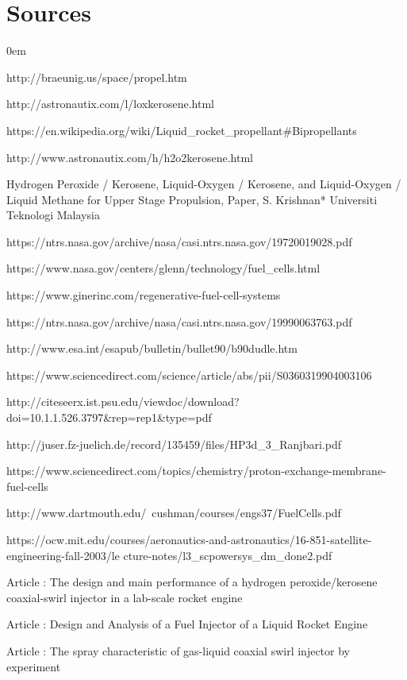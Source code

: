 \documentclass[a4paper,12pt,calibri,oneside,openany]{book}
\theoremstyle{break}
\begin{document}
\chapter*{Sources}
\pagestyle{empty}
\begin{enumerate}
	\itemsep0em 
	\footnotesize{
	\item http://braeunig.us/space/propel.htm
	\item http://astronautix.com/l/loxkerosene.html
	\item https://en.wikipedia.org/wiki/Liquid\_rocket\_propellant\#Bipropellants
	\item http://www.astronautix.com/h/h2o2kerosene.html
	\item Hydrogen Peroxide / Kerosene, Liquid-Oxygen / Kerosene, and Liquid-Oxygen / Liquid
	Methane for Upper Stage Propulsion, Paper, S. Krishnan* Universiti Teknologi Malaysia
	\item https://ntrs.nasa.gov/archive/nasa/casi.ntrs.nasa.gov/19720019028.pdf
	\item https://www.nasa.gov/centers/glenn/technology/fuel\_cells.html
	\item https://www.ginerinc.com/regenerative-fuel-cell-systems
	\item https://ntrs.nasa.gov/archive/nasa/casi.ntrs.nasa.gov/19990063763.pdf
	\item http://www.esa.int/esapub/bulletin/bullet90/b90dudle.htm
	\item https://www.sciencedirect.com/science/article/abs/pii/S0360319904003106
	\item http://citeseerx.ist.psu.edu/viewdoc/download?doi=10.1.1.526.3797\&rep=rep1\&type=pdf
	\item http://juser.fz-juelich.de/record/135459/files/HP3d\_3\_Ranjbari.pdf
	\item https://www.sciencedirect.com/topics/chemistry/proton-exchange-membrane-fuel-cells
	\item http://www.dartmouth.edu/~cushman/courses/engs37/FuelCells.pdf
	\item https://ocw.mit.edu/courses/aeronautics-and-astronautics/16-851-satellite-engineering-fall-2003/le
	cture-notes/l3\_scpowersys\_dm\_done2.pdf
	\item Article : The design and main performance of a hydrogen peroxide/kerosene coaxial-swirl injector in a lab-scale rocket engine
	\item Article : Design and Analysis of a Fuel Injector of a Liquid
	Rocket Engine
	\item Article : The spray characteristic of gas-liquid coaxial swirl injector by experiment
}
\end{enumerate}
\end{document}
